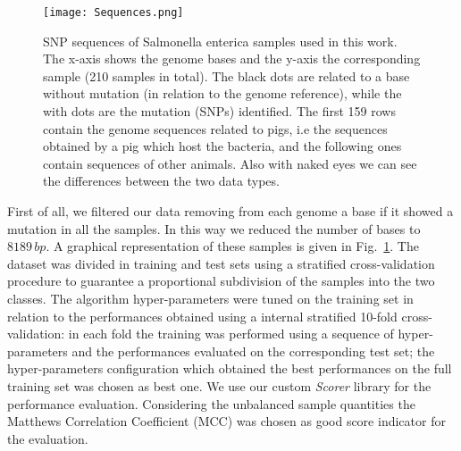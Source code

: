 \documentclass{standalone}
\begin{document}
\begin{figure}[htbp]
\centering
% 
\texttt{[image: Sequences.png]}
\caption{SNP sequences of Salmonella enterica samples used in this work.
The x-axis shows the genome bases and the y-axis the corresponding sample (210 samples in total).
The black dots are related to a base without mutation (in relation to the genome reference), while the with dots are the mutation (SNPs) identified.
The first 159 rows contain the genome sequences related to pigs, i.e the sequences obtained by a pig which host the bacteria, and the following ones contain sequences of other animals.
Also with naked eyes we can see the differences between the two data types.
}
\label{fig:SNPsAle}
\end{figure}

First of all, we filtered our data removing from each genome a base if it showed a mutation in all the samples.
In this way we reduced the number of bases to $8189\,bp$.
A graphical representation of these samples is given in Fig.~\ref{fig:SNPsAle}.
The dataset was divided in training and test sets using a stratified cross-validation procedure to guarantee a proportional subdivision of the samples into the two classes.
The algorithm hyper-parameters were tuned on the training set in relation to the performances obtained using a internal stratified 10-fold cross-validation: in each fold the training was performed using a sequence of hyper-parameters and the performances evaluated on the corresponding test set; the hyper-parameters configuration which obtained the best performances on the full training set was chosen as best one.
We use our custom \emph{Scorer} library for the performance evaluation.
Considering the unbalanced sample quantities the Matthews Correlation Coefficient (MCC) was chosen as good score indicator for the evaluation.
\end{document}
